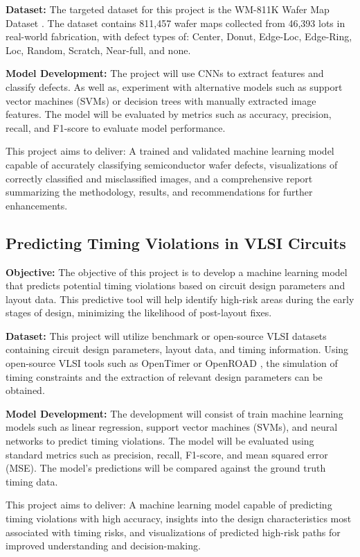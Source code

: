 \documentclass[conference]{IEEEtran}
\begin{document}
\textbf{Dataset:} The targeted dataset for this project is the WM-811K Wafer Map Dataset \cite{b1}. The dataset contains 811,457 wafer maps collected from 46,393 lots in real-world fabrication, with defect types of: Center, Donut, Edge-Loc, Edge-Ring, Loc, Random, Scratch, Near-full, and none.

\textbf{Model Development:} The project will use CNNs to extract features and classify defects. As well as, experiment with alternative models such as support vector machines (SVMs) or decision trees with manually extracted image features.
The model will be evaluated by metrics such as accuracy, precision, recall, and F1-score to evaluate model performance.

This project aims to deliver:
A trained and validated machine learning model capable of accurately classifying semiconductor wafer defects,
visualizations of correctly classified and misclassified images, and
a comprehensive report summarizing the methodology, results, and recommendations for further enhancements.

\subsection{Predicting Timing Violations in VLSI Circuits}
\textbf{Objective:} The objective of this project is to develop a machine learning model that predicts potential timing violations based on circuit design parameters and layout data. 
This predictive tool will help identify high-risk areas during the early stages of design, minimizing the likelihood of post-layout fixes.

\textbf{Dataset:} This project will utilize benchmark or open-source VLSI datasets containing circuit design parameters, layout data, and timing information.
Using open-source VLSI tools such as OpenTimer \cite{b2} or OpenROAD \cite{b3}, the simulation of timing constraints and the extraction of relevant design parameters can be obtained.

\textbf{Model Development:} The development will consist of train machine learning models such as linear regression, support vector machines (SVMs), and neural networks to predict timing violations.
The model will be evaluated using standard metrics such as precision, recall, F1-score, and mean squared error (MSE).
The model's predictions will be compared against the ground truth timing data.

This project aims to deliver:
A machine learning model capable of predicting timing violations with high accuracy,
insights into the design characteristics most associated with timing risks, and
visualizations of predicted high-risk paths for improved understanding and decision-making.
\end{document}
